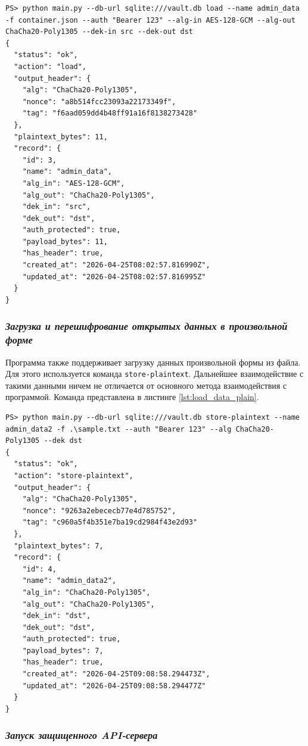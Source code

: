 \documentclass[14pt, a4paper]{extarticle}
\begin{document}
\begin{lstlisting}[style=bashcommand, caption={Загрузка данных из контейнера.}, label=lst:load_data]
PS> python main.py --db-url sqlite:///vault.db load --name admin_data -f container.json --auth "Bearer 123" --alg-in AES-128-GCM --alg-out ChaCha20-Poly1305 --dek-in src --dek-out dst
{
  "status": "ok",
  "action": "load",
  "output_header": {
    "alg": "ChaCha20-Poly1305",
    "nonce": "a8b514fcc23093a22173349f",
    "tag": "f6aad059dd4b48ff91a16f8138273428"
  },
  "plaintext_bytes": 11,
  "record": {
    "id": 3,
    "name": "admin_data",
    "alg_in": "AES-128-GCM",
    "alg_out": "ChaCha20-Poly1305",
    "dek_in": "src",
    "dek_out": "dst",
    "auth_protected": true,
    "payload_bytes": 11,
    "has_header": true,
    "created_at": "2026-04-25T08:02:57.816990Z",
    "updated_at": "2026-04-25T08:02:57.816995Z"
  }
}
\end{lstlisting}

\subsubsection*{\textit{Загрузка и перешифрование открытых данных в произвольной форме}}

Программа также поддерживает загрузку данных произвольной формы из файла. Для этого используется команда \texttt{store-plaintext}. Дальнейшее взаимодействие с такими данными ничем не отличается от основного метода взаимодействия с программой. Команда представлена в листинге \ref{lst:load_data_plain}.

\begin{lstlisting}[style=bashcommand, caption={Загрузка данных произвольного формата}, label=lst:load_data_plain]
PS> python main.py --db-url sqlite:///vault.db store-plaintext --name admin_data2 -f .\sample.txt --auth "Bearer 123" --alg ChaCha20-Poly1305 --dek dst
{
  "status": "ok",
  "action": "store-plaintext",
  "output_header": {
    "alg": "ChaCha20-Poly1305",
    "nonce": "9263a2ebececb77e4d785752",
    "tag": "c960a5f4b351e7ba19cd2984f43e2d93"
  },
  "plaintext_bytes": 7,
  "record": {
    "id": 4,
    "name": "admin_data2",
    "alg_in": "ChaCha20-Poly1305",
    "alg_out": "ChaCha20-Poly1305",
    "dek_in": "dst",
    "dek_out": "dst",
    "auth_protected": true,
    "payload_bytes": 7,
    "has_header": true,
    "created_at": "2026-04-25T09:08:58.294473Z",
    "updated_at": "2026-04-25T09:08:58.294477Z"
  }
}
\end{lstlisting}

\subsubsection*{\textit{Запуск защищенного API-сервера}}
\end{document}
